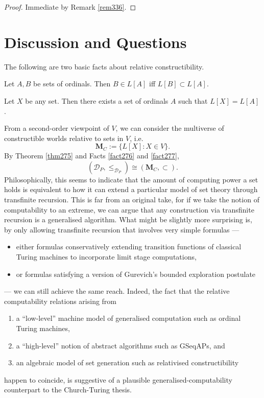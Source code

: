 \documentclass[12pt]{article}
\numberwithin{equation}{section}
\begin{document}
\begin{proof}
Immediate by Remark \ref{rem336}.
\end{proof}

\section{Discussion and Questions}

The following are two basic facts about relative constructibility.

\begin{fact}\label{fact276}
Let $A, B$ be sets of ordinals. Then $B \in L[A]$ iff $L[B] \subset L[A]$.
\end{fact}

\begin{fact}\label{fact277}
Let $X$ be any set. Then there exists a set of ordinals $A$ such that $L[X] = L[A]$.
\end{fact}

From a second-order viewpoint of $V$, we can consider the multiverse of constructible worlds relative to sets in $V$, i.e.
\begin{equation*}
    \mathbf{M}_C := \{L[X] : X \in V\} \text{.}
\end{equation*}
By Theorem \ref{thm275} and Facts \ref{fact276} and \ref{fact277}, 
\begin{equation*}
    (\mathcal{D}_P, \leq_{\mathcal{D}_P}) \cong (\mathbf{M}_C, \subset) \text{.}
\end{equation*}
Philosophically, this seems to indicate that the amount of computing power a set holds is equivalent to how it can extend a particular model of set theory through transfinite recursion. This is far from an original take, for if we take the notion of computability to an extreme, we can argue that any construction via transfinite recursion is a generalised algorithm. What might be slightly more surprising is, by only allowing transfinite recursion that involves very simple formulas ---
\begin{itemize}
    \item either formulas conservatively extending transition functions of classical Turing machines to incorporate limit stage computations,
    \item or formulas satisfying a version of Gurevich's bounded exploration postulate
\end{itemize}
--- we can still achieve the same reach. Indeed, the fact that the relative computability relations arising from
\begin{enumerate}[label=(GCT\arabic*), leftmargin=50pt]
    \item a ``low-level'' machine model of generalised computation such as ordinal Turing machines, 
    \item a ``high-level'' notion of abstract algorithms such as GSeqAPs, and
    \item an algebraic model of set generation such as relativised constructibility
\end{enumerate}
happen to coincide, is suggestive of a plausible generalised-computability counterpart to the Church-Turing thesis.
\end{document}
